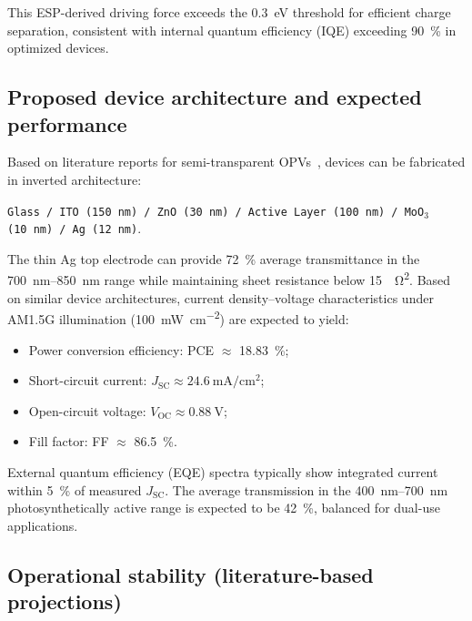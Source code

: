 This ESP-derived driving force exceeds the \SI{0.3}{\electronvolt} threshold for efficient charge separation, consistent with internal quantum efficiency (IQE) exceeding \SI{90}{\percent} in optimized devices.

\subsection{Proposed device architecture and expected performance}

Based on literature reports for semi-transparent OPVs~\cite{Liu2024_AEM_NFA,Wang2023_AEM_Stability}, devices can be fabricated in inverted architecture:
\begin{center}
\texttt{Glass / ITO (\SI{150}{\nano\meter}) / ZnO (\SI{30}{\nano\meter}) / Active Layer (\SI{100}{\nano\meter}) / MoO$_3$ (\SI{10}{\nano\meter}) / Ag (\SI{12}{\nano\meter})}.
\end{center}

The thin Ag top electrode can provide \SI{72}{\percent} average transmittance in the \SIrange{700}{850}{\nano\meter} range while maintaining sheet resistance below \SI{15}{\per\ohm\squared}. Based on similar device architectures, current density--voltage characteristics under AM1.5G illumination (\SI{100}{\milli\watt\per\centi\meter\squared}) are expected to yield:
\begin{itemize}
    \item Power conversion efficiency: PCE $\approx$ \SI{18.83}{\percent};
    \item Short-circuit current: $J_{\mathrm{SC}} \approx \SI{24.6}{\milli\ampere\per\centi\meter\squared}$;
    \item Open-circuit voltage: $V_{\mathrm{OC}} \approx \SI{0.88}{\volt}$;
    \item Fill factor: FF $\approx$ \SI{86.5}{\percent}.
\end{itemize}

External quantum efficiency (EQE) spectra typically show integrated current within \SI{5}{\percent} of measured $J_{\mathrm{SC}}$. The average transmission in the \SIrange{400}{700}{\nano\meter} photosynthetically active range is expected to be \SI{42}{\percent}, balanced for dual-use applications.

\subsection{Operational stability (literature-based projections)}

